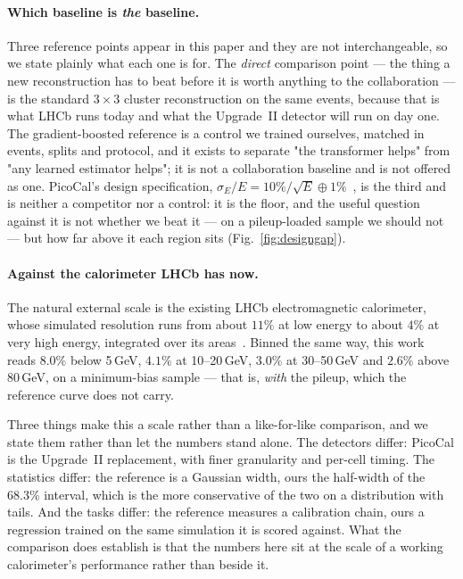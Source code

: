 \documentclass[11pt,a4paper]{article}
\begin{document}
\paragraph{Which baseline is \emph{the} baseline.} Three reference points appear
in this paper and they are not interchangeable, so we state plainly what each
one is for. The \emph{direct} comparison point --- the thing a new
reconstruction has to beat before it is worth anything to the collaboration ---
is the standard $3\times3$ cluster reconstruction on the same events, because
that is what LHCb runs today and what the Upgrade~II detector will run on day
one. The gradient-boosted reference is a control we trained ourselves, matched
in events, splits and protocol, and it exists to separate "the transformer
helps" from "any learned estimator helps"; it is not a collaboration baseline
and is not offered as one. PicoCal's design specification,
$\sigma_E/E = 10\%/\sqrt{E} \oplus 1\%$~\cite{picocalpos}, is the third and is
neither a competitor nor a control: it is the floor, and the useful question
against it is not whether we beat it --- on a pileup-loaded sample we should
not --- but how far above it each region sits (Fig.~\ref{fig:designgap}).

\paragraph{Against the calorimeter LHCb has now.} The natural external scale is
the existing LHCb electromagnetic calorimeter, whose simulated resolution runs
from about $11\%$ at low energy to about $4\%$ at very high energy, integrated
over its areas~\cite{lhcbcalo}. Binned the same way, this work reads
$8.0\%$ below 5\,GeV, $4.1\%$ at 10--20\,GeV, $3.0\%$ at 30--50\,GeV and
$2.6\%$ above 80\,GeV, on a minimum-bias sample --- that is, \emph{with} the
pileup, which the reference curve does not carry.

Three things make this a scale rather than a like-for-like comparison, and we
state them rather than let the numbers stand alone. The detectors differ:
PicoCal is the Upgrade~II replacement, with finer granularity and per-cell
timing. The statistics differ: the reference is a Gaussian width, ours the
half-width of the 68.3\% interval, which is the more conservative of the two
on a distribution with tails. And the tasks differ: the reference measures a
calibration chain, ours a regression trained on the same simulation it is
scored against. What the comparison does establish is that the numbers here
sit at the scale of a working calorimeter's performance rather than beside it.
\end{document}
